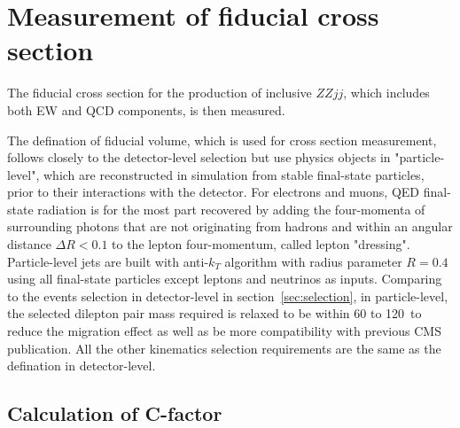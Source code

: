 \section{Measurement of fiducial cross section}
\label{sec:xsec}

The fiducial cross section for the production of inclusive $ZZjj$, which includes both EW and QCD components, is then measured.

The defination of fiducial volume, which is used for cross section measurement, follows closely to the detector-level selection
but use physics objects in "particle-level", which are reconstructed in simulation from stable final-state particles,
prior to their interactions with the detector.
For electrons and muons, QED final-state radiation is for the most part recovered 
by adding the four-momenta of surrounding photons that are not originating from hadrons and within an angular distance $\Delta R < 0.1$
to the lepton four-momentum, called lepton "dressing".
Particle-level jets are built with anti-$k_{T}$ algorithm with radius parameter $R = 0.4$ using all final-state particles except leptons and neutrinos as inputs.
Comparing to the events selection in detector-level in section~\ref{sec:selection},
in particle-level, the selected dilepton pair mass required is relaxed to be within 60 to 120~\gev to reduce the migration effect
as well as be more compatibility with previous CMS publication\cite{2017682}.
All the other kinematics selection requirements are the same as the defination in detector-level.

\subsection{Calculation of C-factor}
\label{sec:cf}

